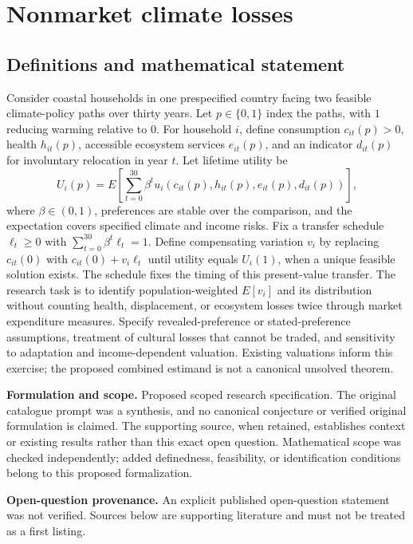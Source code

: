 \documentclass[11pt]{article}
\begin{document}
\section*{Nonmarket climate losses}\label{30007714}
\subsection{Definitions and mathematical statement}
Consider coastal households in one prespecified country facing two feasible climate-policy paths over thirty years. Let \(p\in\{0,1\}\) index the paths, with \(1\) reducing warming relative to \(0\). For household \(i\), define consumption \(c_{it}(p)>0\), health \(h_{it}(p)\), accessible ecosystem services \(e_{it}(p)\), and an indicator \(d_{it}(p)\) for involuntary relocation in year \(t\). Let lifetime utility be
\[U_i(p)=E\!\left[\sum_{t=0}^{30}\beta^t u_i(c_{it}(p),h_{it}(p),e_{it}(p),d_{it}(p))\right],\]
where \(\beta\in(0,1)\), preferences are stable over the comparison, and the expectation covers specified climate and income risks. Fix a transfer schedule \(\ell_t\geq0\) with \(\sum_{t=0}^{30}\beta^t\ell_t=1\). Define compensating variation \(v_i\) by replacing \(c_{it}(0)\) with \(c_{it}(0)+v_i\ell_t\) until utility equals \(U_i(1)\), when a unique feasible solution exists. The schedule fixes the timing of this present-value transfer. The research task is to identify population-weighted \(E[v_i]\) and its distribution without counting health, displacement, or ecosystem losses twice through market expenditure measures. Specify revealed-preference or stated-preference assumptions, treatment of cultural losses that cannot be traded, and sensitivity to adaptation and income-dependent valuation. Existing valuations inform this exercise; the proposed combined estimand is not a canonical unsolved theorem.

\par\textbf{Formulation and scope.} Proposed scoped research specification. The original catalogue prompt was a synthesis, and no canonical conjecture or verified original formulation is claimed. The supporting source, when retained, establishes context or existing results rather than this exact open question. Mathematical scope was checked independently; added definedness, feasibility, or identification conditions belong to this proposed formalization.

\par\textbf{Open-question provenance.} An explicit published open-question statement was not verified. Sources below are supporting literature and must not be treated as a first listing.
\end{document}
